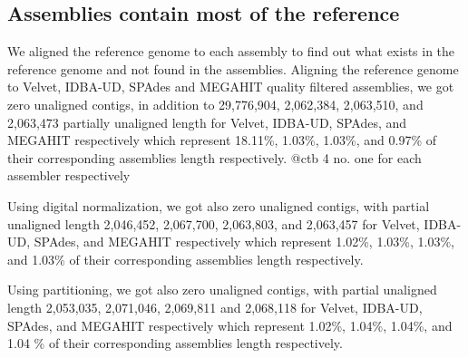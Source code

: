    
\subsection*{Assemblies contain most of the reference} 
We aligned the reference genome to each assembly to find out what exists in the reference genome and not found in the assemblies. 
Aligning the reference genome to Velvet, IDBA-UD, SPAdes and MEGAHIT quality filtered assemblies, we got zero unaligned contigs, in addition to 29,776,904, 2,062,384, 2,063,510, and 2,063,473 partially unaligned length for Velvet, IDBA-UD, SPAdes, and MEGAHIT respectively which represent 18.11\%, 1.03\%, 1.03\%, and 0.97\% of their corresponding assemblies length respectively. 
@ctb 4 no. one for each assembler respectively


Using digital normalization, we got also zero unaligned contigs, with partial unaligned length 2,046,452, 2,067,700, 2,063,803, and 2,063,457 for Velvet, IDBA-UD, SPAdes, and MEGAHIT respectively which represent 1.02\%, 1.03\%, 1.03\%, and 1.03\% of their corresponding assemblies length respectively.


Using partitioning, we got also zero unaligned contigs, with partial unaligned length 2,053,035, 2,071,046, 2,069,811 and 2,068,118 for Velvet, IDBA-UD, SPAdes, and MEGAHIT respectively which represent 1.02\%, 1.04\%, 1.04\%, and 1.04 \% of their corresponding assemblies length respectively. 



